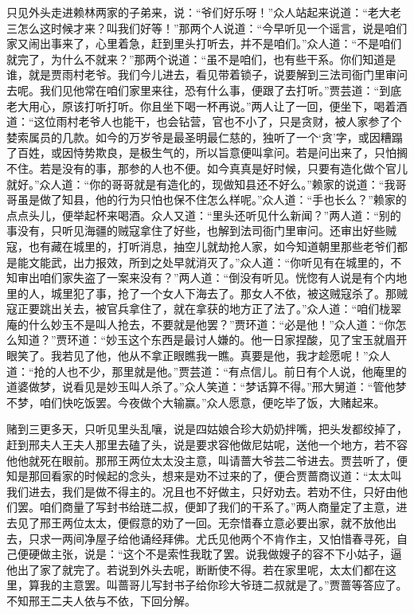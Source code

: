 \begin{parag}
    只见外头走进赖林两家的子弟来，说：“爷们好乐呀！”众人站起来说道：“老大老三怎么这时候才来？叫我们好等！”那两个人说道：“今早听见一个谣言，说是咱们家又闹出事来了，心里着急，赶到里头打听去，并不是咱们。”众人道：“不是咱们就完了，为什么不就来？”那两个说道：“虽不是咱们，也有些干系。你们知道是谁，就是贾雨村老爷。我们今儿进去，看见带着锁子，说要解到三法司衙门里审问去呢。我们见他常在咱们家里来往，恐有什么事，便跟了去打听。”贾芸道：“到底老大用心，原该打听打听。你且坐下喝一杯再说。”两人让了一回，便坐下，喝着酒道：“这位雨村老爷人也能干，也会钻营，官也不小了，只是贪财，被人家参了个婪索属员的几款。如今的万岁爷是最圣明最仁慈的，独听了一个‘贪’字，或因糟蹋了百姓，或因恃势欺良，是极生气的，所以旨意便叫拿问。若是问出来了，只怕搁不住。若是没有的事，那参的人也不便。如今真真是好时候，只要有造化做个官儿就好。”众人道：“你的哥哥就是有造化的，现做知县还不好么。”赖家的说道：“我哥哥虽是做了知县，他的行为只怕也保不住怎么样呢。”众人道：“手也长么？”赖家的点点头儿，便举起杯来喝酒。众人又道：“里头还听见什么新闻？”两人道：“别的事没有，只听见海疆的贼寇拿住了好些，也解到法司衙门里审问。还审出好些贼寇，也有藏在城里的，打听消息，抽空儿就劫抢人家，如今知道朝里那些老爷们都是能文能武，出力报效，所到之处早就消灭了。”众人道：“你听见有在城里的，不知审出咱们家失盗了一案来没有？”两人道：“倒没有听见。恍惚有人说是有个内地里的人，城里犯了事，抢了一个女人下海去了。那女人不依，被这贼寇杀了。那贼寇正要跳出关去，被官兵拿住了，就在拿获的地方正了法了。”众人道：“咱们栊翠庵的什么妙玉不是叫人抢去，不要就是他罢？”贾环道：“必是他！”众人道：“你怎么知道？”贾环道：“妙玉这个东西是最讨人嫌的。他一日家捏酸，见了宝玉就眉开眼笑了。我若见了他，他从不拿正眼瞧我一瞧。真要是他，我才趁愿呢！”众人道：“抢的人也不少，那里就是他。”贾芸道：“有点信儿。前日有个人说，他庵里的道婆做梦，说看见是妙玉叫人杀了。”众人笑道：“梦话算不得。”邢大舅道：“管他梦不梦，咱们快吃饭罢。今夜做个大输赢。”众人愿意，便吃毕了饭，大赌起来。
\end{parag}


\begin{parag}
    赌到三更多天，只听见里头乱嚷，说是四姑娘合珍大奶奶拌嘴，把头发都绞掉了，赶到邢夫人王夫人那里去磕了头，说是要求容他做尼姑呢，送他一个地方，若不容他他就死在眼前。那邢王两位太太没主意，叫请蔷大爷芸二爷进去。贾芸听了，便知是那回看家的时候起的念头，想来是劝不过来的了，便合贾蔷商议道：“太太叫我们进去，我们是做不得主的。况且也不好做主，只好劝去。若劝不住，只好由他们罢。咱们商量了写封书给琏二叔，便卸了我们的干系了。”两人商量定了主意，进去见了邢王两位太太，便假意的劝了一回。无奈惜春立意必要出家，就不放他出去，只求一两间净屋子给他诵经拜佛。尤氏见他两个不肯作主，又怕惜春寻死，自己便硬做主张，说是：“这个不是索性我耽了罢。说我做嫂子的容不下小姑子，逼他出了家了就完了。若说到外头去呢，断断使不得。若在家里呢，太太们都在这里，算我的主意罢。叫蔷哥儿写封书子给你珍大爷琏二叔就是了。”贾蔷等答应了。不知邢王二夫人依与不依，下回分解。
\end{parag}